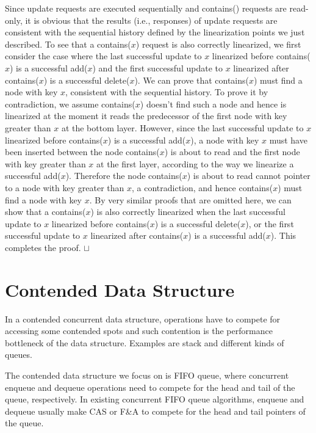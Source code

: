 \documentclass[11pt]{article}
\newcommand{\sq}{\hbox{\rlap{$\sqcap$}$\sqcup$}}
\newcommand{\qed}{\hspace*{\fill}\sq}
\begin{document}
Since update requests are executed sequentially and contains() requests are read-only, 
it is obvious that the results (i.e., responses) of update requests are consistent 
with the sequential history defined by the linearization points we just described. 
To see that a contains($x$) request is also correctly linearized, we first consider the case where 
the last successful update to $x$ linearized before contains($x$) is a successful add($x$) and 
the first successful update to $x$ linearized after contains($x$) is a successful delete($x$). 
We can prove that contains($x$) must find a node with key $x$, consistent with the sequential history. 
To prove it by contradiction, we assume contains($x$) doesn't find such a node and hence is linearized 
at the moment it reads the predecessor of the first node with key greater than $x$ at the bottom layer. 
However, since the last successful update to $x$ linearized before contains($x$) is a successful add($x$), 
a node with key $x$ must have been inserted between the node contains($x$) is about to read and the first 
node with key greater than $x$ at the first layer, according to the way we linearize a successful add($x$). 
Therefore the node contains($x$) is about to read cannot pointer to a node with key greater than $x$, 
a contradiction, and hence contains($x$) must find a node with key $x$. 
By very similar proofs that are omitted here, we can show that a contains($x$) is also correctly linearized 
when the last successful update to $x$ linearized before contains($x$) is a successful delete($x$), or
the first successful update to $x$ linearized after contains($x$) is a successful add($x$). 
This completes the proof. 
\qed


\section{Contended Data Structure}
\label{section:contended}
In a contended concurrent data structure, operations have to compete for
accessing some contended spots and
such contention is the performance bottleneck of the data structure.
Examples are stack and different kinds of queues.

The contended data structure we focus on is FIFO queue, where concurrent enqueue
and dequeue operations need to compete for the head and tail of the queue, respectively.
In existing concurrent FIFO queue algorithms, enqueue and dequeue usually
make CAS or F\&A to compete for the head and tail pointers of the queue.
\end{document}
